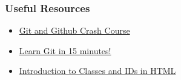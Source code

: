 \documentclass{beamer}
\begin{document}
\begin{frame}
  \frametitle{Useful Resources}
  \begin{itemize}
  	\item \href{https://www.youtube.com/watch?v=SWYqp7iY_Tc}{Git and Github Crash Course}
  	\item \href{https://www.youtube.com/watch?v=USjZcfj8yxE}{Learn Git in 15 minutes!}
  	\item \href{https://www.youtube.com/watch?v=wXUhTZpF_HQ}{Introduction to Classes and IDs in HTML}
 \end{itemize}
\end{frame}
\end{document}
